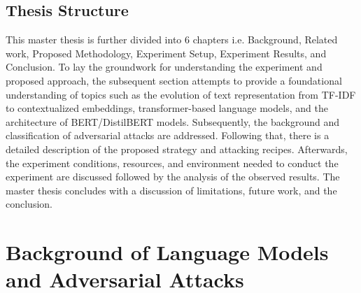 \documentclass[%
	BCOR=8mm, %
	DIV=12,
	toc=bibliography, %
	toc=listof, %
	oneside, %
	egregdoesnotlikesansseriftitles, %
	]{scrbook}
\begin{document}
\section{Thesis Structure}
This master thesis is further divided into 6 chapters i.e. Background, Related work, Proposed Methodology, Experiment Setup, Experiment Results, and Conclusion. To lay the groundwork for understanding the experiment and proposed approach, the subsequent section attempts to provide a foundational understanding of topics such as the evolution of text representation from TF-IDF to contextualized embeddings, transformer-based language models, and the architecture of BERT/DistilBERT models. Subsequently, the background and classification of adversarial attacks are addressed. Following that, there is a detailed description of the proposed strategy and attacking recipes. Afterwards, the experiment conditions, resources, and environment needed to conduct the experiment are discussed followed by the analysis of the observed results. The master thesis concludes with a discussion of limitations, future work, and the conclusion.
\chapter{Background of Language Models and Adversarial Attacks}
\label{section:background}
\end{document}
